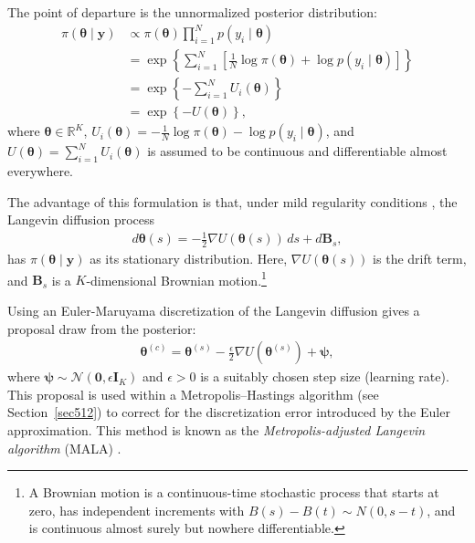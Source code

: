 The point of departure is the unnormalized posterior distribution:
\begin{align*}
	\pi(\boldsymbol{\theta} \mid \mathbf{y}) &\propto \pi(\boldsymbol{\theta}) \prod_{i=1}^{N} p(y_i \mid \boldsymbol{\theta}) \\
	&= \exp\left\{ \sum_{i=1}^N \left[ \frac{1}{N} \log \pi(\boldsymbol{\theta}) + \log p(y_i \mid \boldsymbol{\theta}) \right] \right\} \\
	&= \exp\left\{ -\sum_{i=1}^N U_i(\boldsymbol{\theta}) \right\} \\
	&= \exp\left\{ -U(\boldsymbol{\theta}) \right\},
\end{align*}
where \( \boldsymbol{\theta} \in \mathbb{R}^K \), \( U_i(\boldsymbol{\theta}) = -\frac{1}{N} \log \pi(\boldsymbol{\theta}) - \log p(y_i \mid \boldsymbol{\theta}) \), and \( U(\boldsymbol{\theta}) = \sum_{i=1}^N U_i(\boldsymbol{\theta}) \) is assumed to be continuous and differentiable almost everywhere.  

The advantage of this formulation is that, under mild regularity conditions \cite{roberts1996exponential}, the Langevin diffusion process
\begin{align*}
	d\boldsymbol{\theta}(s) = -\frac{1}{2} \nabla U(\boldsymbol{\theta}(s))\,ds + d\mathbf{B}_s,
\end{align*}
has \( \pi(\boldsymbol{\theta} \mid \mathbf{y}) \) as its stationary distribution. Here, \( \nabla U(\boldsymbol{\theta}(s)) \) is the drift term, and \( \mathbf{B}_s \) is a \( K \)-dimensional Brownian motion.\footnote{A Brownian motion is a continuous-time stochastic process that starts at zero, has independent increments with \( B(s) - B(t) \sim {N}(0, s - t) \), and is continuous almost surely but nowhere differentiable.}

Using an Euler-Maruyama discretization of the Langevin diffusion gives a proposal draw from the posterior:
\begin{align*}
	\boldsymbol{\theta}^{(c)} = \boldsymbol{\theta}^{(s)} - \frac{\epsilon}{2} \nabla U(\boldsymbol{\theta}^{(s)}) + \boldsymbol{\psi},
\end{align*}
where \( \boldsymbol{\psi} \sim \mathcal{N}(\mathbf{0}, \epsilon \mathbf{I}_K) \) and \( \epsilon > 0 \) is a suitably chosen step size (learning rate). This proposal is used within a Metropolis–Hastings algorithm (see Section~\ref{sec512}) to correct for the discretization error introduced by the Euler approximation. This method is known as the \textit{Metropolis-adjusted Langevin algorithm} (MALA) \cite{roberts1996exponential}. 

